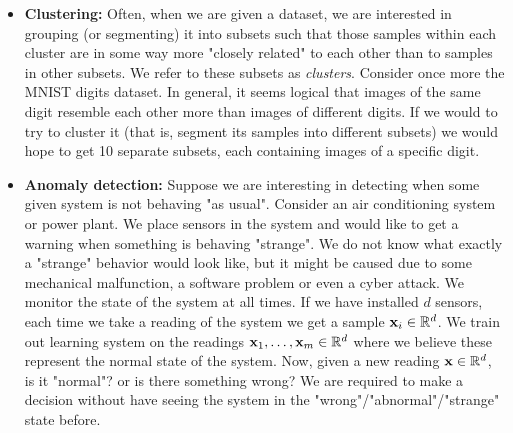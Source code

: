 \begin{itemize}
~\\
\item \textbf{Clustering:} Often, when we are given a dataset, we are interested in grouping (or segmenting) it into subsets such that those samples within each cluster are in some way more "closely related" to each other than to samples in other subsets. We refer to these subsets as \textit{clusters}. Consider once more the MNIST digits dataset. In general, it seems logical that images of the same digit resemble each other more than images of different digits. If we would to try to cluster it (that is, segment its samples into different subsets) we would hope to get 10 separate subsets, each containing images of a specific digit.\\
\item \textbf{Anomaly detection:} Suppose we are interesting in detecting when some given system is not behaving "as usual". Consider an air conditioning system or power plant. We place sensors in the system and would like to get a warning when something is behaving "strange". We do not know what exactly a "strange" behavior would look like, but it might be caused due to some mechanical malfunction, a software problem or even a cyber attack. We monitor the state of the system at all times. If we have installed $d$ sensors, each time we take a reading of the system we get a sample $\mathbf{x}_i\in\mathbb{R}^d$. We train out learning system on the readings $\mathbf{x}_1,\ldots,\mathbf{x}_m\in\mathbb{R}^d$ where we believe these represent the normal state of the system. Now, given a new reading $\mathbf{x}\in\mathbb{R}^d$, is it "normal"? or is there something wrong? We are required to make a decision without have seeing the system in the "wrong"/"abnormal"/"strange" state before.
\end{itemize}

